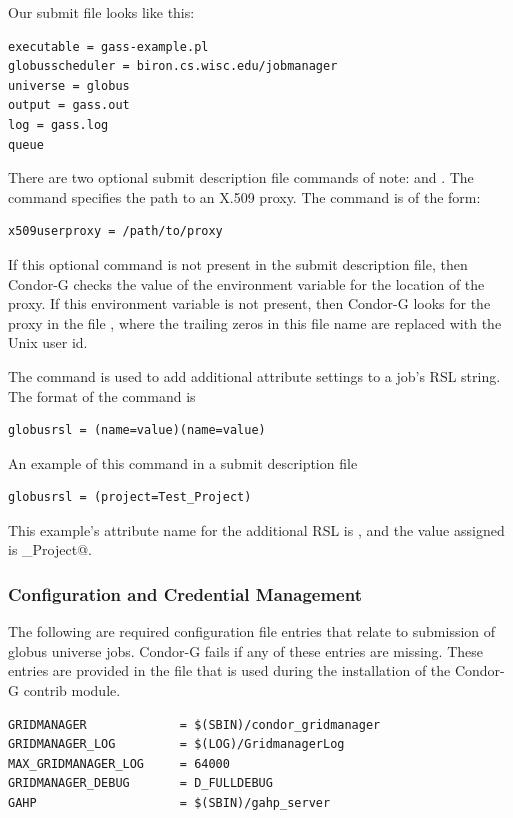 Our submit file looks like this:

\begin{verbatim}
executable = gass-example.pl
globusscheduler = biron.cs.wisc.edu/jobmanager
universe = globus
output = gass.out
log = gass.log
queue
\end{verbatim}

There are two optional submit description file commands
of note:
 and
.
The  command specifies the path to
an X.509 proxy.
The command is of the form:
\begin{verbatim}
x509userproxy = /path/to/proxy
\end{verbatim}
If this optional command is not present in the submit description file,
then Condor-G checks the value of the environment variable
 for the location of the proxy.
If this environment variable is not present, then Condor-G
looks for the proxy in the file
,
where the trailing zeros in this file name are
replaced with the Unix user id.

The  command is used to add additional
attribute settings to a job's RSL string.
The format of the  command is
\begin{verbatim}
globusrsl = (name=value)(name=value)
\end{verbatim}
An example of this command in a submit description file
\begin{verbatim}
globusrsl = (project=Test_Project)
\end{verbatim}
This example's attribute name for the additional RSL is
\verb@project@, and the value assigned is \verb@Test_Project@.

\subsubsection{\label{sec:Condor-G-Credentials}Configuration and Credential Management}

The following are required configuration file entries that
relate to submission of globus universe jobs.
Condor-G fails if any of these entries are missing.
These entries are provided in the file
that is used during the installation of the Condor-G contrib module.

\begin{verbatim}
GRIDMANAGER             = $(SBIN)/condor_gridmanager
GRIDMANAGER_LOG         = $(LOG)/GridmanagerLog
MAX_GRIDMANAGER_LOG     = 64000
GRIDMANAGER_DEBUG       = D_FULLDEBUG
GAHP                    = $(SBIN)/gahp_server
\end{verbatim} 


